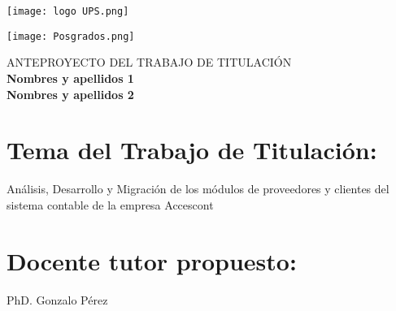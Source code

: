 \documentclass{article}
\begin{document}
\colorbox{white!10!}{
    \begin{minipage}[t]{0.05\textwidth} %
       \begin{flushright}
        \texttt{[image: logo UPS.png]}
       \end{flushright}
    \end{minipage}
    \begin{minipage}[H]{0.62 \textwidth} %
        \begin{center}
         
        \end{center}
     \end{minipage}
    \begin{minipage}[t]{0.05 \textwidth}
        \begin{flushleft}
        \hspace{10.25cm}
            \texttt{[image: Posgrados.png]}
        \end{flushleft}
    \end{minipage}
}

\vspace{0.1cm}
\begin{center}
{\large\textsc{ANTEPROYECTO DEL TRABAJO DE TITULACIÓN}} \\
\vspace{0.5cm}
{ \large \textbf{Nombres y apellidos 1}} \\ 
\vspace{0.25cm}
{ \large \textbf{Nombres y apellidos 2 }}
\end{center}
\vspace{0.1cm}

\section{Tema del Trabajo de Titulación:  }
\begin{center}
Análisis, Desarrollo y Migración de los módulos de proveedores y clientes del sistema contable de la empresa Accescont
\end{center}
\section{Docente tutor propuesto:   }
\begin{center}
PhD. Gonzalo Pérez
\end{center}
\end{document}
